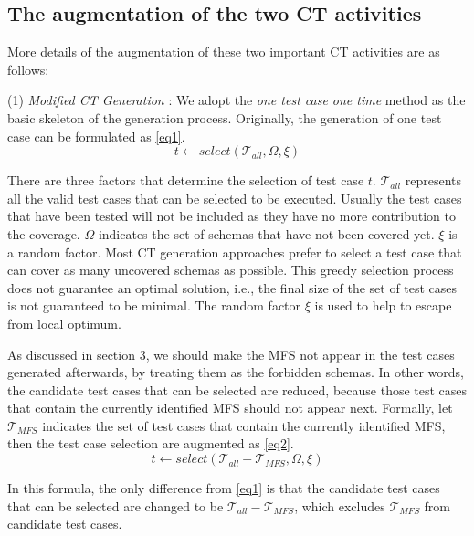 \documentclass{sig-alternate}
\begin{document}
\subsection{The augmentation of the two CT activities}
More details of the augmentation of these two important CT activities are as follows:

(1) \emph{Modified CT Generation} :
We adopt the \emph{one test case one time} method as the basic skeleton of the generation process. Originally, the generation of one test case can be formulated as \ref{eq1}.
\begin{displaymath} t \leftarrow  select (\mathcal{T}_{all}, \Omega ,  \xi) \tag{EQ1} \label{eq1} \end{displaymath}

There are three factors that determine the selection of test case $t$. $\mathcal{T}_{all}$ represents all the valid test cases that can be selected to be executed. Usually the test cases that have been tested will not be included as they have no more contribution to the coverage. $\Omega$ indicates the set of schemas that have not been covered yet. $\xi$ is a random factor. Most CT generation approaches prefer to select a test case that can cover as many uncovered schemas as possible. This greedy selection process does not guarantee an optimal solution, i.e., the final size of the set of test cases is not guaranteed to be minimal. The random factor $\xi$ is used to help to escape from local optimum.



As discussed in section 3, we should make the MFS not appear in the test cases generated afterwards, by treating them as the forbidden schemas. In other words, the candidate test cases that can be selected are reduced, because those test cases that contain the currently identified MFS should not appear next. Formally,  let $\mathcal{T}_{MFS}$ indicates the set of test cases that contain the currently identified MFS, then the test case selection are augmented as \ref{eq2}.
\begin{displaymath} t \leftarrow  select (\mathcal{T}_{all} - \mathcal{T}_{MFS}, \Omega ,  \xi ) \tag{EQ2} \label{eq2} \end{displaymath}

In this formula, the only difference from \ref{eq1} is that the candidate test cases that can be selected are changed to be $\mathcal{T}_{all} - \mathcal{T}_{MFS}$, which excludes $\mathcal{T}_{MFS}$ from candidate test cases.
\end{document}
